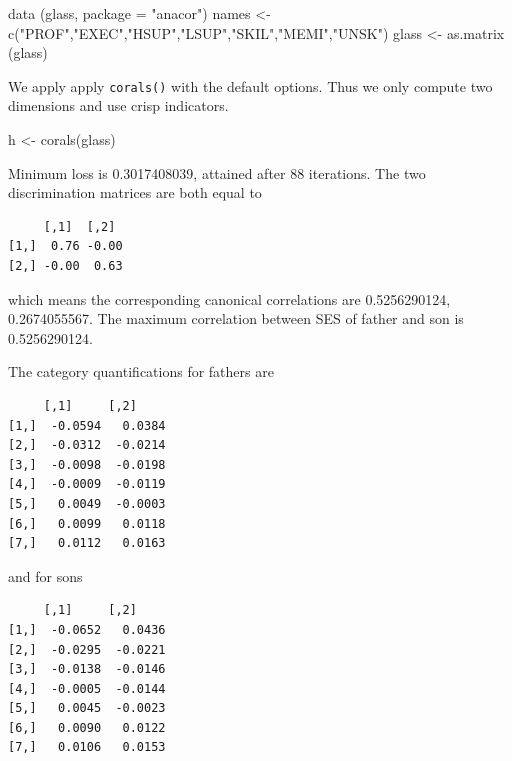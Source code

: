 \documentclass[
  12pt,
  letterpaper,
  DIV=11,
  numbers=noendperiod]{scrreprt}
\newenvironment{Shaded}{\begin{snugshade}}{\end{snugshade}}
\newcommand{\AttributeTok}[1]{\textcolor[rgb]{0.40,0.45,0.13}{#1}}
\newcommand{\FunctionTok}[1]{\textcolor[rgb]{0.28,0.35,0.67}{#1}}
\newcommand{\NormalTok}[1]{\textcolor[rgb]{0.00,0.23,0.31}{#1}}
\newcommand{\OtherTok}[1]{\textcolor[rgb]{0.00,0.23,0.31}{#1}}
\newcommand{\StringTok}[1]{\textcolor[rgb]{0.13,0.47,0.30}{#1}}
\begin{document}
\begin{Shaded}
\begin{Highlighting}[]
\FunctionTok{data}\NormalTok{ (glass, }\AttributeTok{package =} \StringTok{"anacor"}\NormalTok{)}
\NormalTok{names }\OtherTok{\textless{}{-}} \FunctionTok{c}\NormalTok{(}\StringTok{"PROF"}\NormalTok{,}\StringTok{"EXEC"}\NormalTok{,}\StringTok{"HSUP"}\NormalTok{,}\StringTok{"LSUP"}\NormalTok{,}\StringTok{"SKIL"}\NormalTok{,}\StringTok{"MEMI"}\NormalTok{,}\StringTok{"UNSK"}\NormalTok{)}
\NormalTok{glass }\OtherTok{\textless{}{-}} \FunctionTok{as.matrix}\NormalTok{ (glass)}
\end{Highlighting}
\end{Shaded}

We apply apply \texttt{corals()} with the default options. Thus we only
compute two dimensions and use crisp indicators.

\begin{Shaded}
\begin{Highlighting}[]
\NormalTok{h }\OtherTok{\textless{}{-}} \FunctionTok{corals}\NormalTok{(glass)}
\end{Highlighting}
\end{Shaded}

Minimum loss is 0.3017408039, attained after 88 iterations. The two
discrimination matrices are both equal to

\begin{verbatim}
     [,1]  [,2] 
[1,]  0.76 -0.00
[2,] -0.00  0.63
\end{verbatim}

which means the corresponding canonical correlations are 0.5256290124,
0.2674055567. The maximum correlation between SES of father and son is
0.5256290124.

The category quantifications for fathers are

\begin{verbatim}
     [,1]     [,2]    
[1,]  -0.0594   0.0384
[2,]  -0.0312  -0.0214
[3,]  -0.0098  -0.0198
[4,]  -0.0009  -0.0119
[5,]   0.0049  -0.0003
[6,]   0.0099   0.0118
[7,]   0.0112   0.0163
\end{verbatim}

and for sons

\begin{verbatim}
     [,1]     [,2]    
[1,]  -0.0652   0.0436
[2,]  -0.0295  -0.0221
[3,]  -0.0138  -0.0146
[4,]  -0.0005  -0.0144
[5,]   0.0045  -0.0023
[6,]   0.0090   0.0122
[7,]   0.0106   0.0153
\end{verbatim}
\end{document}
